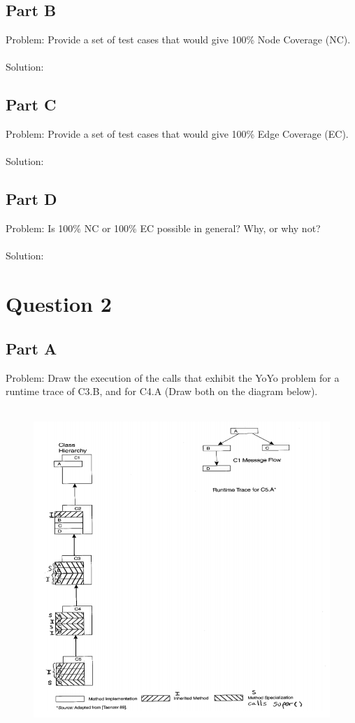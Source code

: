 \documentclass{article}
\begin{document}
\subsection*{Part B}
Problem: Provide a set of test cases that would give 100\% Node Coverage (NC). \\\\
Solution:

\subsection*{Part C}
Problem: Provide a set of test cases that would give 100\% Edge Coverage (EC). \\\\
Solution: 

\subsection*{Part D}
Problem: Is 100\% NC or 100\% EC possible in general? Why, or why not? \\\\
Solution: 

\newpage

\section*{Question 2}

\subsection*{Part A}
Problem: Draw the execution of the calls that exhibit the YoYo problem for a runtime trace of
C3.B, and for C4.A (Draw both on the diagram below). \\\\
\begin{figure}[h]
	\centering
	\includegraphics[width=6in]{yo-yo-diagram.png}
\end{figure}
\end{document}
